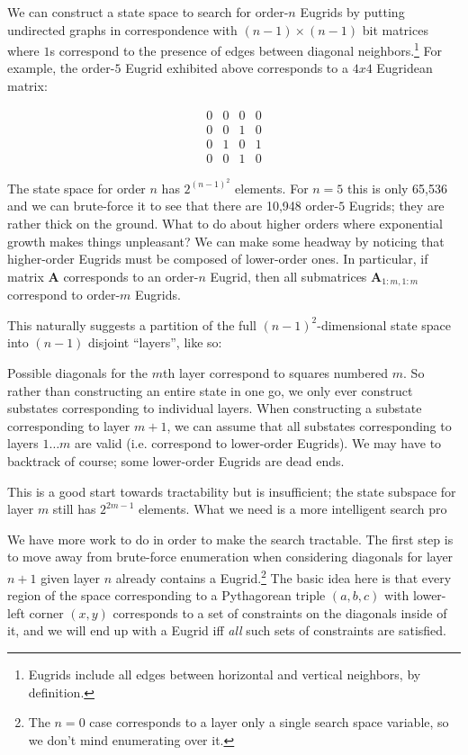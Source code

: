 \documentclass[letterpaper]{article}
\begin{document}
We can construct a state space to search for order-$n$ Eugrids by putting undirected graphs
in correspondence with $(n - 1) \times (n - 1)$ bit matrices where $1$s correspond to the
presence of edges between diagonal neighbors.\footnote{Eugrids include all edges between
horizontal and vertical neighbors, by definition.} For example, the order-$5$ Eugrid
exhibited above corresponds to a $4 x 4$ Eugridean matrix:

\begin{equation*}
\begin{matrix}
  0 & 0 & 0 & 0 \\
  0 & 0 & 1 & 0 \\
  0 & 1 & 0 & 1 \\
  0 & 0 & 1 & 0
\end{matrix}
\end{equation*}

The state space for order $n$ has $2^{(n-1)^2}$ elements. For $n=5$ this is only 65,536 and
we can brute-force it to see that there are 10,948 order-$5$ Eugrids; they are rather thick
on the ground. What to do about higher orders where exponential growth makes things
unpleasant? We can make some headway by noticing that higher-order Eugrids must be composed
of lower-order ones. In particular, if matrix $\mathbf{A}$ corresponds to an order-$n$
Eugrid, then all submatrices $\mathbf{A}_{1:m,1:m}$ correspond to order-$m$ Eugrids.

This naturally suggests a partition of the full $(n-1)^2$-dimensional state space into
$(n-1)$ disjoint ``layers'', like so:

\begin{center}
  
\end{center}

Possible diagonals for the $m$th layer correspond to squares numbered $m$. So rather than
constructing an entire state in one go, we only ever construct substates corresponding to
individual layers. When constructing a substate corresponding to layer $m+1$, we can assume
that all substates corresponding to layers $1 \ldots m$ are valid (i.e. correspond to
lower-order Eugrids). We may have to backtrack of course; some lower-order Eugrids are dead
ends.

This is a good start towards tractability but is insufficient; the state subspace for layer
$m$ still has $2^{2m-1}$ elements. What we need is a more intelligent search pro

We have more work to do in order to make the search tractable. The first step is to move away
from brute-force enumeration when considering diagonals for layer $n+1$ given layer $n$
already contains a Eugrid.\footnote{The $n=0$ case corresponds to a layer only a single
search space variable, so we don't mind enumerating over it.} The basic idea here is that
every region of the space corresponding to a Pythagorean triple $(a, b, c)$ with lower-left
corner $(x, y)$ corresponds to a set of constraints on the diagonals inside of it, and we
will end up with a Eugrid iff \emph{all} such sets of constraints are satisfied.
\end{document}
